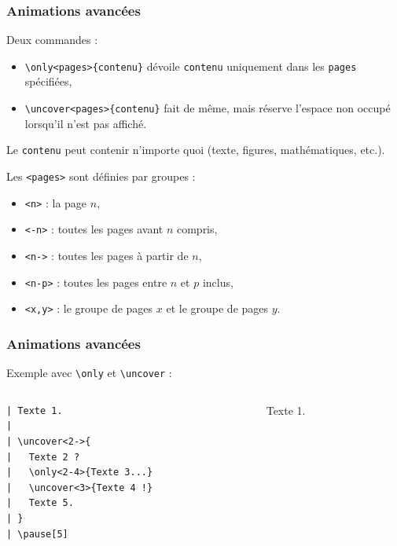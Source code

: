 \begin{frame}[fragile]
  \frametitle{Animations avancées}

Deux commandes :
\begin{itemize}
  \item \lstinline?\only<pages>{contenu}? dévoile \lstinline?contenu? uniquement dans les \lstinline?pages? spécifiées,
  \item \lstinline?\uncover<pages>{contenu}? fait de même, mais réserve l'espace non occupé lorsqu'il n'est pas affiché.
\end{itemize}

Le \lstinline?contenu? peut contenir n'importe quoi (texte, figures, mathématiques, etc.).

Les \lstinline?<pages>? sont définies par groupes :
\begin{itemize}
  \item \lstinline?<n>? : la page $n$,
  \item \lstinline?<-n>? : toutes les pages avant $n$ compris,
  \item \lstinline?<n->? : toutes les pages à partir de $n$,
  \item \lstinline?<n-p>? : toutes les pages entre $n$ et $p$ inclus,
  \item \lstinline?<x,y>? : le groupe de pages $x$ et le groupe de pages $y$.
\end{itemize}
\end{frame}



\begin{frame}[fragile]
  \frametitle{Animations avancées}

Exemple avec \lstinline?\only? et \lstinline?\uncover? :
\begin{columns}
  \begin{column}{0.35\textwidth}
\begin{lstlisting}
| Texte 1.
| 
| \uncover<2->{
|   Texte 2 ?
|   \only<2-4>{Texte 3...}
|   \uncover<3>{Texte 4 !}
|   Texte 5.
| }
| \pause[5]
\end{lstlisting}
  \end{column}
  \begin{column}{0.60\textwidth}
\rmfamily
Texte 1.

\pause[5]
  \end{column}
\end{columns}
\end{frame}



